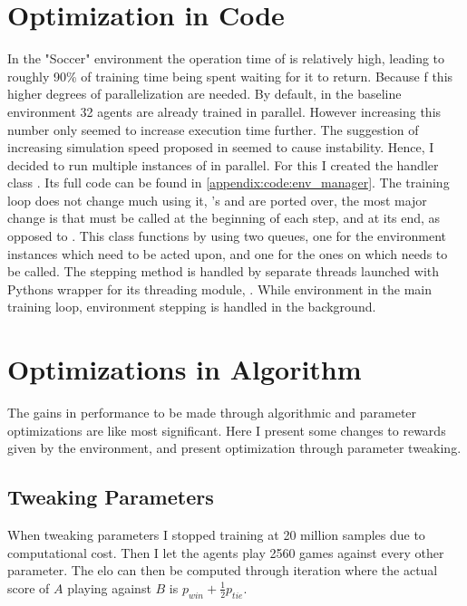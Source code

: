 \section{Optimization in Code}\label{sec:tr:optimization}
In the "Soccer" environment the operation time of  is relatively high, leading to roughly 90\% of training time being spent waiting for it to return. Because f this higher degrees of parallelization  are needed. By default, in the baseline environment 32 agents are already trained in parallel. However increasing this number only seemed to increase execution time further. The suggestion of increasing simulation speed proposed in \cite{noauthor_unity-technologiesml-agents_2020} seemed to cause instability. Hence, I decided to run multiple instances of  in parallel. For this I created the handler class . Its full code can be found in \ref{appendix:code:env_manager}. The training loop does not change much using it, 's  and  are ported over, the most major change is that  must be called at the beginning of each step, and  at its end, as opposed to . This class functions by using two queues, one for the environment instances which need to be acted upon, and one for the ones on which  needs to be called. The stepping method is handled by separate threads launched with Pythons wrapper for its threading module, . While environment in the main training loop, environment stepping is handled in the background. 
\section{Optimizations in Algorithm}\label{sec:tr:param_tweaking}
The gains in performance to be made through algorithmic and parameter optimizations are like most significant. Here I present some changes to rewards given by the environment, and present optimization through parameter tweaking.

\subsection{Tweaking Parameters}\label{subsec:tr:opt_alg:parameters}
When tweaking parameters I stopped training at 20 million samples due to computational cost. Then I let the agents play 2560 games against every other parameter. The elo can then be computed through iteration where the actual score of $A$ playing against $B$ is $p_{win} + \frac{1}{2}p_{tie}$.

